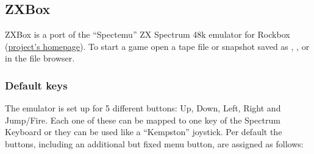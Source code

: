 \subsection{\label{ref:ZXBox}ZXBox}
ZXBox is a port of the ``Spectemu'' ZX Spectrum 48k emulator for Rockbox
(\Pointinghand\href{http://kempelen.iit.bme.hu/~mszeredi/spectemu/spectemu.html}
{project's homepage}). To start a game open a tape file or snapshot saved as
, ,  or  in the file browser.\\

\subsubsection{Default keys}
The emulator is set up for 5 different buttons: Up, Down, Left, Right and
Jump/Fire. Each one of these can be mapped to one key of the Spectrum Keyboard
or they can be used like a ``Kempston'' joystick. Per default the buttons,
including an additional but fixed menu button, are assigned as follows:

